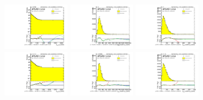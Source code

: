 \begin{figure}[htbp!]
\begin{center}
\includegraphics[width=0.25\textwidth,angle=-90]{figures/boosted/Reweight/Fits/Moriond_NoTag_2Trk_split_subl_Incl_leadHCand_Pt_m_1.pdf}
\includegraphics[width=0.25\textwidth,angle=-90]{figures/boosted/Reweight/Fits/Moriond_NoTag_2Trk_split_subl_Incl_leadHCand_trk0_Pt.pdf}
\includegraphics[width=0.25\textwidth,angle=-90]{figures/boosted/Reweight/Fits/Moriond_NoTag_2Trk_split_subl_Incl_leadHCand_trk1_Pt.pdf} \\
\includegraphics[width=0.25\textwidth,angle=-90]{figures/boosted/Reweight/Fits/Moriond_bkg_0_NoTag_2Trk_split_subl_Incl_leadHCand_Pt_m_1.pdf}
\includegraphics[width=0.25\textwidth,angle=-90]{figures/boosted/Reweight/Fits/Moriond_bkg_0_NoTag_2Trk_split_subl_Incl_leadHCand_trk0_Pt.pdf}
\includegraphics[width=0.25\textwidth,angle=-90]{figures/boosted/Reweight/Fits/Moriond_bkg_0_NoTag_2Trk_split_subl_Incl_leadHCand_trk1_Pt.pdf} \\

\end{center}
\end{figure}
